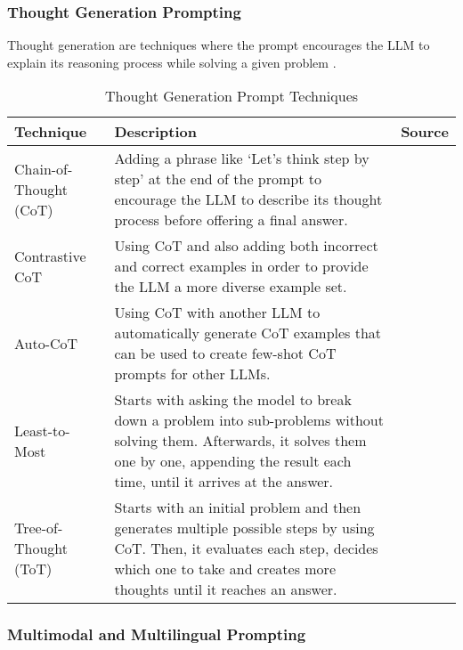 \FloatBarrier

\subsubsection{Thought Generation Prompting}

Thought generation are techniques where the prompt encourages the LLM to explain its reasoning process while solving a given problem \parencite{prompt1}.

\begin{table}[h!]
    \centering
    \begin{tabular}{p{3cm} p{8cm} p{2cm}}
        \toprule
        \textbf{Technique} & \textbf{Description} & \textbf{Source} \\
        \midrule
        \raggedright
        Chain-of-Thought (CoT) & Adding a phrase like `Let's think step by step' at the end of the prompt to encourage the LLM to describe its thought process before offering a final answer. & \textcite{cot} \\
        \hline
        \raggedright
        Contrastive CoT & Using CoT and also adding both incorrect and correct examples in order to provide the LLM a more diverse example set.  & \textcite{contrastive-cot} \\
        \hline
        \raggedright
        Auto-CoT & Using CoT with another LLM to automatically generate CoT examples that can be used to create few-shot CoT prompts for other LLMs. &  \textcite{auto-cot} \\
        \hline
        \raggedright
        Least-to-Most & Starts with asking the model to break down a problem into sub-problems without solving them. Afterwards, it solves them one by one, appending the result each time, until it arrives at the answer. & \textcite{least-most} \\
        \hline
        \raggedright
        Tree-of-Thought (ToT) & Starts with an initial problem and then generates multiple possible steps by using CoT. Then, it evaluates each step, decides which one to take and creates more thoughts until it reaches an answer. & \textcite{treeofthought} \\
        \bottomrule
    \end{tabular}
    \caption{Thought Generation Prompt Techniques}
    \label{tab:thought_gen}
\end{table}

\FloatBarrier

\subsubsection{Multimodal and Multilingual Prompting}

